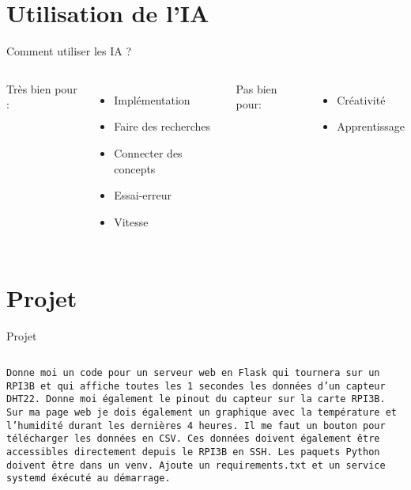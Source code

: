 \documentclass[aspectratio=169,xcolor=dvipsnames]{beamer}
\begin{document}
\section{Utilisation de l'IA}

\begin{frame}{Comment utiliser les IA ?}
    \begin{columns}[c] %

        Très bien pour :
        \begin{itemize}
            \item Implémentation
            \item Faire des recherches
            \item Connecter des concepts
            \item Essai-erreur
            \item Vitesse
        \end{itemize}

        Pas bien pour:
        \begin{itemize}
            \item Créativité
            \item Apprentissage
        \end{itemize}

    \end{columns}
\end{frame}

\section{Projet}

\begin{frame}{Projet}
    \begin{columns}[c] %

            \texttt{Donne moi un code pour un serveur web en Flask qui tournera sur un RPI3B et qui affiche toutes les 1 secondes les données d'un capteur DHT22. Donne moi également le pinout du capteur sur la carte RPI3B. Sur ma page web je dois également un graphique avec la température et l'humidité durant les dernières 4 heures. Il me faut un bouton pour télécharger les données en CSV. Ces données doivent également être accessibles directement depuis le RPI3B en SSH. Les paquets Python doivent être dans un venv. Ajoute un requirements.txt et un service systemd éxécuté au démarrage.}

    \end{columns}
\end{frame}
\end{document}
